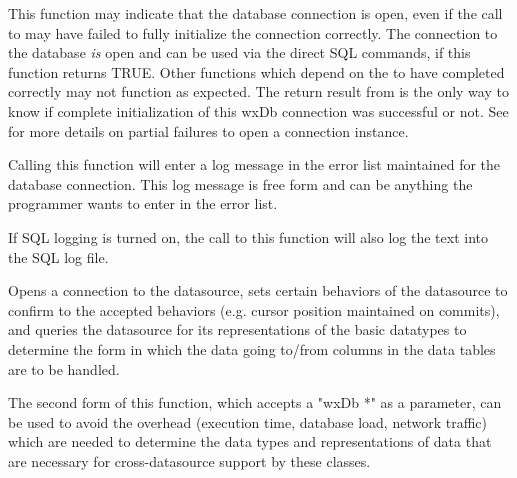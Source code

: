 This function may indicate that the database connection is open, even if 
the call to  may have failed to fully 
initialize the connection correctly.  The connection to the database 
{\it is} open and can be used via the direct SQL commands, if this 
function returns TRUE.  Other functions which depend on the 
 to have completed correctly may not function 
as expected.  The return result from  is the 
only way to know if complete initialization of this wxDb connection was 
successful or not.  See  for more details on 
partial failures to open a connection instance.


\label{wxdblogerror}




Calling this function will enter a log message in the error list maintained
for the database connection.  This log message is free form and can be
anything the programmer wants to enter in the error list.

If SQL logging is turned on, the call to this function will also log the
text into the SQL log file.




\label{wxdbopen}



Opens a connection to the datasource, sets certain behaviors of the datasource 
to confirm to the accepted behaviors (e.g. cursor position maintained on 
commits), and queries the datasource for its representations of the basic 
datatypes to determine the form in which the data going to/from columns in 
the data tables are to be handled.

The second form of this function, which accepts a "wxDb *" as a parameter, 
can be used to avoid the overhead (execution time, database load, network 
traffic) which are needed to determine the data types and representations 
of data that are necessary for cross-datasource support by these classes.  

